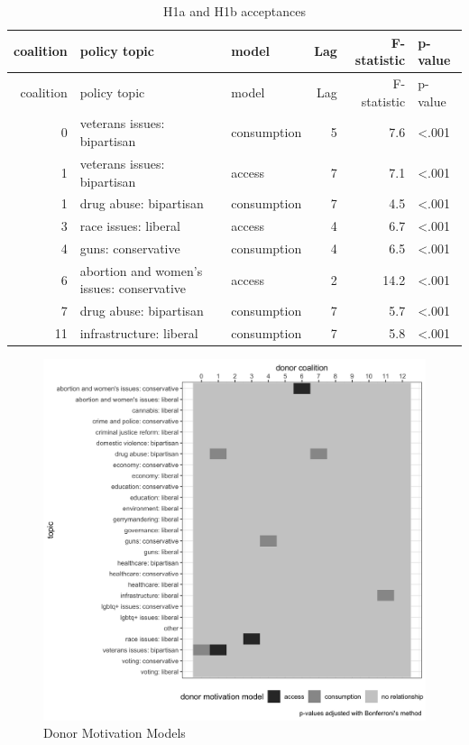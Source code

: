 \documentclass[12pt,]{article}
\begin{document}
\begin{longtable}[]{@{}rllrrl@{}}
\caption{H1a and H1b acceptances}\tabularnewline
\toprule
coalition & policy topic & model & Lag & F-statistic & p-value \\
\midrule
\endfirsthead
\toprule
coalition & policy topic & model & Lag & F-statistic & p-value \\
\midrule
\endhead
0 & veterans issues: bipartisan & consumption & 5 & 7.6 &
\textless.001 \\
1 & veterans issues: bipartisan & access & 7 & 7.1 & \textless.001 \\
1 & drug abuse: bipartisan & consumption & 7 & 4.5 & \textless.001 \\
3 & race issues: liberal & access & 4 & 6.7 & \textless.001 \\
4 & guns: conservative & consumption & 4 & 6.5 & \textless.001 \\
6 & abortion and women's issues: conservative & access & 2 & 14.2 &
\textless.001 \\
7 & drug abuse: bipartisan & consumption & 7 & 5.7 & \textless.001 \\
11 & infrastructure: liberal & consumption & 7 & 5.8 & \textless.001 \\
\bottomrule
\end{longtable}

\begin{figure}
\centering
\includegraphics{../tables_and_figures/fig_2.jpg}
\caption{Donor Motivation Models}
\end{figure}
\end{document}
